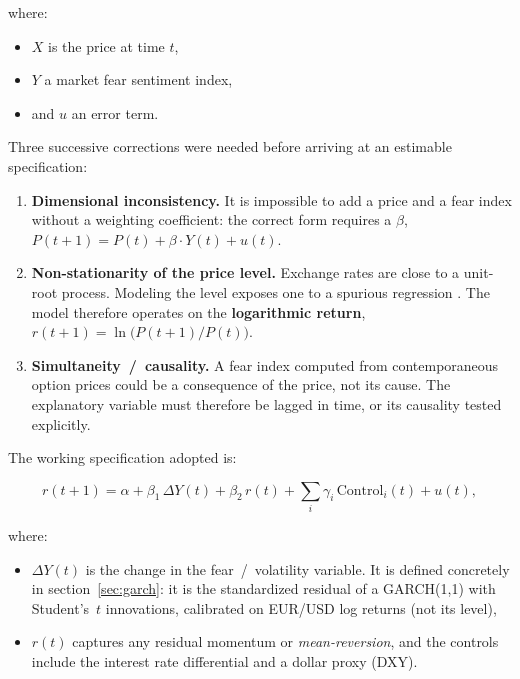 \documentclass[12pt,a4paper]{article}
\begin{document}
where:

\begin{itemize}
	\item $X$ is the price at time $t$,
	\item	$Y$ a market fear sentiment index, 
	\item and $u$ an error term. 
\end{itemize}

\newpage

Three successive corrections were needed before arriving at an estimable specification:

\begin{enumerate}
	\item \textbf{Dimensional inconsistency.} It is impossible
	to add a price and a fear index without a weighting
	coefficient: the correct form requires a $\beta$,
	$P(t+1) = P(t) + \beta \cdot Y(t) + u(t)$.
	\item \textbf{Non-stationarity of the price level.} Exchange
	rates are close to a unit-root process. Modeling the level exposes one to a spurious regression
	\citep{grangernewbold1974}. The model therefore operates on the
	\textbf{logarithmic return}, $r(t+1) = \ln\!\big(P(t+1)/P(t)\big)$.
	\item \textbf{Simultaneity~/~causality.} A fear index computed from contemporaneous option prices could be a consequence of the price, not its cause. The explanatory variable must therefore be lagged in time, or its causality tested
	explicitly.
\end{enumerate}

\vspace{0.8cm}

The working specification adopted is:

\begin{center}
	\begin{keyeq}
		\begin{equation}
			r(t+1) = \alpha + \beta_1 \, \Delta Y(t) + \beta_2 \, r(t)
			+ \sum_i \gamma_i \, \text{Control}_i(t) + u(t),
			\label{eq:master-spec}
		\end{equation}
	\end{keyeq}
\end{center}



\vspace{0.4cm}

where:

\begin{itemize}
	\item $\Delta Y(t)$ is the change in the fear~/~volatility variable. It is defined concretely in section~\ref{sec:garch}: it is the standardized residual of a GARCH(1,1) with Student's~$t$ innovations, calibrated on EUR/USD log returns (not its level), 
	\item $r(t)$ captures any residual momentum or \emph{mean-reversion}, and the controls include the interest rate differential and a dollar proxy (DXY).
\end{itemize} 
\end{document}
